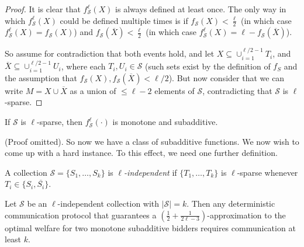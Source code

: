   \begin{proof} It is clear that $f^\ell_\mathcal{S}(X)$ is always defined at
    least once. The only way in which $f^\ell_\mathcal{S}(X)$ could be defined
    multiple times is if $f_\mathcal{S}(X) < \frac{\ell}{2}$ (in which case
    $f^\ell_\mathcal{S}(X) = f_\mathcal{S}(X)$) and
    $f_\mathcal{S}(\overline{X}) < \frac{\ell}{2}$ (in which case
    $f^\ell_\mathcal{S}(X) = \ell - f_\mathcal{S}(\overline{X})$). 

    So assume for contradiction that both events hold, and let $X \subseteq
    \cup_{i=1}^{\ell/2-1} T_i$, and $\overline{X} \subseteq \cup_{i=1}^{\ell/2-1}
    U_i$, where each $T_i, U_i \in \mathcal{S}$
    (such sets exist by the definition of $f_S$ and the assumption that
    $f_\mathcal{S}(X), f_\mathcal{S}(\overline{X}) < \ell/2$).
    But now consider that we can write $M = X \cup \overline{X}$ as a union
    of $\leq \ell -2$ elements of $\mathcal{S}$, contradicting that $\mathcal{S}$ is
    $\ell$-sparse.  
  \end{proof} 

  \begin{proposition} 
    If $\mathcal{S}$ is $\ell$-sparse, then
    $f^\ell_\mathcal{S}(\cdot)$ is monotone and subadditive.
  \end{proposition}

  (Proof omitted). So now we have a class of subadditive functions. We now wish to
  come up with a hard instance. To this effect, we need one further definition.

  \begin{definition} 
    A collection $\mathcal{S} = \{S_1,\ldots,
    S_k\}$ is \emph{$\ell$-independent} if 
    $\{T_1,\ldots, T_k\}$ is $\ell$-sparse
    whenever $T_i \in \{S_i, \overline{S_i}\}$.
  \end{definition}

  \begin{proposition}\label{prop:lindependent}Let $\mathcal{S}$ be an
  $\ell$-independent collection with $|\mathcal{S}| = k$. Then any deterministic
  communication protocol that guarantees a $(\frac{1}{2} +
  \frac{1}{2\ell-3})$-approximation to the optimal welfare for two monotone
  subadditive bidders requires communication at least $k$.  \end{proposition}

